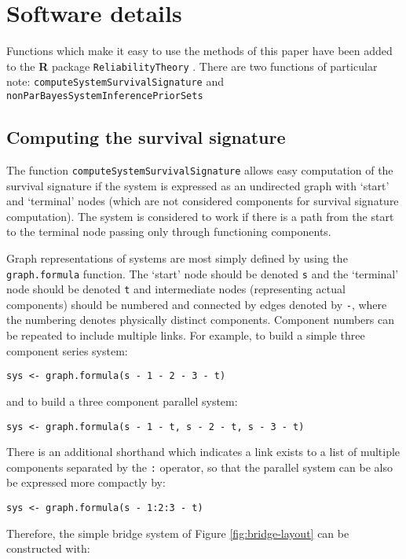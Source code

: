 \documentclass[12pt, a4paper]{elsarticle}
\begin{document}
\section{Software details}
\label{ap:software}

Functions which make it easy to use the methods of this paper have been added to the \textbf{R} package \texttt{ReliabilityTheory} \citep{2015:aslett-RT}.  There are two functions of particular note: \texttt{computeSystemSurvivalSignature} and \texttt{nonParBayesSystemInferencePriorSets}

\subsection{Computing the survival signature}

The function \texttt{computeSystemSurvivalSignature} allows easy 
computation of the survival signature if the system is expressed as an
undirected graph with `start' and `terminal' nodes (which are not
considered components for survival signature computation).  The system
is considered to work if there is a path from the start to the terminal
node passing only through functioning components.

Graph representations of systems are most simply defined by using the 
\texttt{graph.formula} function.  The `start' node should be denoted
\texttt{s} and the `terminal' node should be denoted \texttt{t} and
intermediate nodes (representing actual components) should be numbered and
connected by edges denoted by \texttt{-}, where the numbering denotes physically
distinct components.  Component numbers can be repeated to include
multiple links.  For example, to build a simple three component series
system:

\noindent\texttt{sys <- graph.formula(s\,-\,1\,-\,2\,-\,3\,-\,t)}

and to build a three component parallel system:

\noindent\texttt{sys <- graph.formula(s\,-\,1\,-\,t, s\,-\,2\,-\,t, s\,-\,3\,-\,t)}

There is an additional shorthand which indicates a link exists to a list of multiple components separated by the \texttt{:} operator, so that the parallel system can be also be expressed more compactly by:

\noindent\texttt{sys <- graph.formula(s\,-\,1:2:3\,-\,t)}

Therefore, the simple bridge system of Figure \ref{fig:bridge-layout} can be constructed with:
\end{document}
